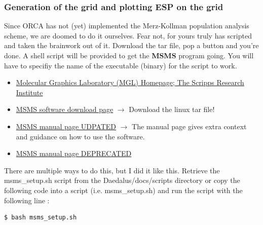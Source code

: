 \documentclass[a4paper]{article}
\begin{document}
\subsubsection{Generation of the grid and plotting ESP on the grid}\label{sec:MSMS}
Since ORCA has not (yet) implemented the Merz-Kollman population analysis scheme, we are doomed to do it ourselves. Fear not, for yours truly has scripted and taken the brainwork out of it. Download the tar file, pop a button and you're done.  A shell script will be provided to get the \textbf{MSMS} program going. You will have to specifiy the name of the executable (binary) for the script to work.
\begin{itemize}
    \item \href{https://ccsb.scripps.edu/mgltools/#msms}{Molecular Graphics Laboratory (MGL) Homepage; The Scripps Research Institute}
    \item \href{https://ccsb.scripps.edu/msms/downloads/}{MSMS software download page} $\rightarrow$  Download the linux tar file!
    \item \href{https://ccsb.scripps.edu/msms/documentation/}{MSMS manual page UDPATED} $\rightarrow$ The manual page gives extra context and guidance on how to use the software.
    \item \href{https://www.scripps.edu/sanner/html/msms_man.html}{MSMS manual page DEPRECATED} 
\end{itemize}
%
There are multiple ways to do this, but I did it like this. Retrieve the msms\_setup.sh script from the Daedalus/docs/scripts directory or copy the following code into a script (i.e. msms\_setup.sh) and run the script with the following line : 
\begin{tcolorbox}
\begin{verbatim}
$ bash msms_setup.sh
\end{verbatim}
\end{tcolorbox}
\end{document}
